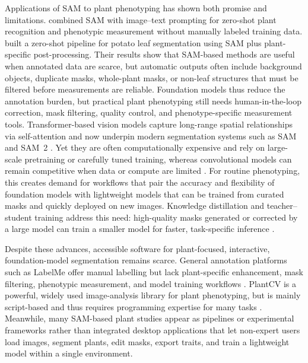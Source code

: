 \documentclass[12pt, a4paper]{article}
\begin{document}
Applications of SAM to plant phenotyping has shown both promise and limitations. \citet{zhang2024adapting} combined SAM with image–text prompting for zero-shot plant recognition and phenotypic measurement without manually labeled training data. \citet{williams2024leafonlysam} built a zero-shot pipeline for potato leaf segmentation using SAM plus plant-specific post-processing. Their results show that SAM-based methods are useful when annotated data are scarce, but automatic outputs often include background objects, duplicate masks, whole-plant masks, or non-leaf structures that must be filtered before measurements are reliable. Foundation models thus reduce the annotation burden, but practical plant phenotyping still needs human-in-the-loop correction, mask filtering, quality control, and phenotype-specific measurement tools. Transformer-based vision models capture long-range spatial relationships via self-attention and now underpin modern segmentation systems such as SAM and SAM~2 \citep{dosovitskiy2021image,ravi2025sam2}. Yet they are often computationally expensive and rely on large-scale pretraining or carefully tuned training, whereas convolutional models can remain competitive when data or compute are limited \citep{chen2021visformer}. For routine phenotyping, this creates demand for workflows that pair the accuracy and flexibility of foundation models with lightweight models that can be trained from curated masks and quickly deployed on new images. Knowledge distillation and teacher–student training address this need: high-quality masks generated or corrected by a large model can train a smaller model for faster, task-specific inference \citep{hinton2015distilling,zhang2023mobilesam}.

Despite these advances, accessible software for plant-focused, interactive, foundation-model segmentation remains scarce. General annotation platforms such as LabelMe offer manual labelling but lack plant-specific enhancement, mask filtering, phenotypic measurement, and model training workflows \citep{russell2008labelme}. PlantCV is a powerful, widely used image-analysis library for plant phenotyping, but is mainly script-based and thus requires programming expertise for many tasks \citep{gehan2017plantcv}. Meanwhile, many SAM-based plant studies appear as pipelines or experimental frameworks rather than integrated desktop applications that let non-expert users load images, segment plants, edit masks, export traits, and train a lightweight model within a single environment.
\end{document}
